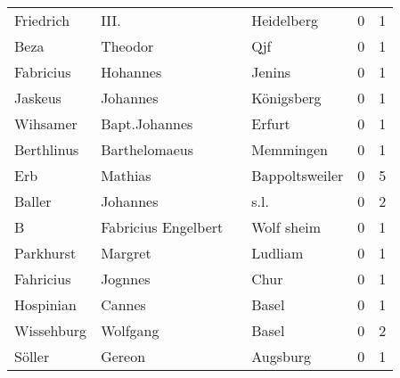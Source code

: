 \begin{tabular}{llllrr}
                Friedrich &                               III. &             &                                  Heidelberg &          0 &         1 \\
                     Beza &                            Theodor &             &                                         Qjf &          0 &         1 \\
                Fabricius &                           Hohannes &             &                                      Jenins &          0 &         1 \\
                  Jaskeus &                           Johannes &             &                                  Königsberg &          0 &         1 \\
                 Wihsamer &                      Bapt.Johannes &             &                                      Erfurt &          0 &         1 \\
               Berthlinus &                      Barthelomaeus &             &                                   Memmingen &          0 &         1 \\
                      Erb &                            Mathias &             &                              Bappoltsweiler &          0 &         5 \\
                   Baller &                           Johannes &             &                                        s.l. &          0 &         2 \\
                        B &                Fabricius Engelbert &             &                                  Wolf sheim &          0 &         1 \\
                Parkhurst &                            Margret &             &                                     Ludliam &          0 &         1 \\
                Fahricius &                            Jognnes &             &                                        Chur &          0 &         1 \\
                Hospinian &                             Cannes &             &                                       Basel &          0 &         1 \\
               Wissehburg &                           Wolfgang &             &                                       Basel &          0 &         2 \\
                   Söller &                             Gereon &             &                                    Augsburg &          0 &         1 \\

\end{tabular}
